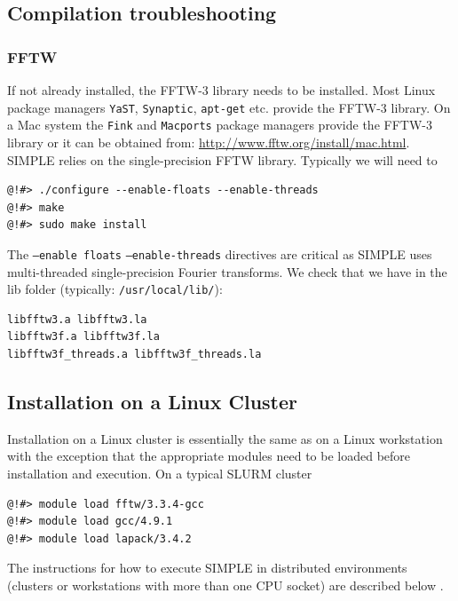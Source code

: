 \documentclass[a4paper,11pt]{article}
\begin{document}
\subsection{Compilation troubleshooting}
\label{compiletrouble}

\subsubsection{FFTW}
If not already installed, the FFTW-3 library needs to be installed. Most Linux package managers \texttt{YaST}, \texttt{Synaptic}, \texttt{apt-get} etc. provide the FFTW-3 library. On a Mac system the \texttt{Fink} and \texttt{Macports} package managers provide the FFTW-3 library or it can be obtained from: \url{http://www.fftw.org/install/mac.html}. SIMPLE relies on the single-precision FFTW library. Typically we will need to
\begin{verbatim}
@!#> ./configure --enable-floats --enable-threads
@!#> make
@!#> sudo make install
\end{verbatim}
The \texttt{--enable floats} \texttt{--enable-threads} directives are critical as SIMPLE uses multi-threaded single-precision Fourier transforms. We check that we have in the lib folder (typically: \texttt{/usr/local/lib/}):
\begin{verbatim}
libfftw3.a libfftw3.la
libfftw3f.a libfftw3f.la
libfftw3f_threads.a libfftw3f_threads.la
\end{verbatim}

\subsection{Installation on a Linux Cluster}
\label{inst_clusters_linux}

Installation on a Linux cluster is essentially the same as on a Linux workstation with the exception that the appropriate modules need to be loaded before installation and execution. On a typical SLURM cluster
\begin{verbatim}
@!#> module load fftw/3.3.4-gcc
@!#> module load gcc/4.9.1
@!#> module load lapack/3.4.2 
\end{verbatim}
The instructions for how to execute SIMPLE in distributed environments (clusters or workstations with more than one CPU socket) are described below \label{distr}.
\end{document}
